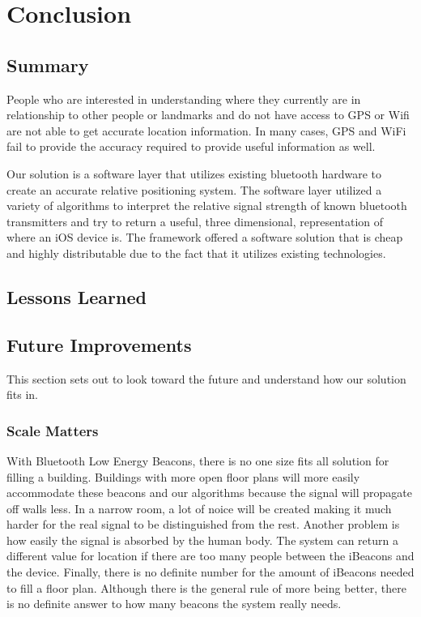 \chapter{Conclusion}
\section{Summary}

People who are interested in understanding where they currently are in relationship to other people or landmarks and do
not have access to GPS or Wifi are not able to get accurate location information. In many cases, GPS and WiFi fail to provide the
accuracy required to provide useful information as well.
\newline \par
Our solution is a software layer that utilizes existing bluetooth
hardware to create an accurate relative positioning system. The software layer utilized a variety of algorithms to interpret the
relative signal strength of known bluetooth transmitters and try to return a useful, three dimensional, representation of
where an iOS device is. The framework offered a software solution that is cheap and
highly distributable due to the fact that it utilizes existing technologies.

\section{Lessons Learned}

\section{Future Improvements}

This section sets out to look toward the future and understand how our solution fits in.

\subsection{Scale Matters}
With Bluetooth Low Energy Beacons, there is no one size fits all solution for filling a building. Buildings with more open floor plans will more easily accommodate
these beacons and our algorithms because the signal will propagate off walls less. In a narrow room, a lot of noice will be created making it much harder for the real signal to be distinguished from the rest.
Another problem is how easily the signal is absorbed by the human body. The system can return a different value for location if there are too many people between the iBeacons and the device. Finally, there is no definite number for the amount of iBeacons
needed to fill a floor plan. Although there is the general rule of more being better, there is no definite answer to how many beacons the system really needs.

